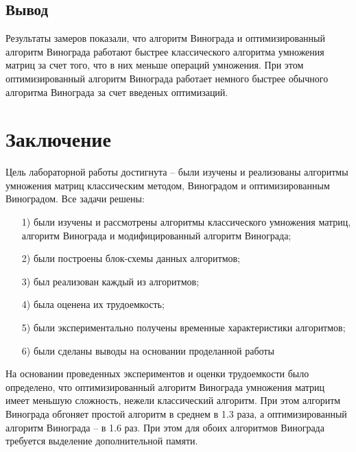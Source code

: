 \documentclass[12pt]{report}
\begin{document}
	\section*{Вывод}
	
	Результаты замеров показали, что алгоритм Винограда и оптимизированный алгоритм Винограда работают быстрее классического алгоритма умножения матриц за счет того, что в них меньше операций умножения. При этом оптимизированный алгоритм Винограда работает немного быстрее обычного алгоритма Винограда за счет введеных оптимизаций. 
	
	\chapter*{Заключение}
	
	Цель лабораторной работы достигнута -- были изучены и реализованы алгоритмы умножения матриц классическим методом, Виноградом и оптимизированным Виноградом. Все задачи решены:
	
	\begin{enumerate}
		\item[1)] были изучены и рассмотрены алгоритмы классического умножения матриц, алгоритм Винограда и модифицированный алгоритм Винограда;
		\item[2)] были построены блок-схемы данных алгоритмов;
		\item[3)] был реализован каждый из алгоритмов;
		\item[4)] была оценена их трудоемкость;
		\item[5)] были экспериментально получены временные характеристики алгоритмов;
		\item[6)] были сделаны выводы на основании проделанной работы
	\end{enumerate}
	
	На основании проведенных экспериментов и оценки трудоемкости было определено, что оптимизированный алгоритм Винограда умножения матриц имеет меньшую сложность, нежели классический алгоритм. При этом алгоритм Винограда обгоняет простой алгоритм в среднем в 1.3 раза, а оптимизированный алгоритм Винограда -- в 1.6 раз. При этом для обоих алгоритмов Винограда требуется выделение дополнительной памяти. 
	

\nocite{*} 

\renewcommand\bibname{Список использованных источников} %
	
\end{document}
